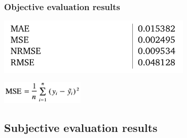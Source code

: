 \documentclass[a4paper,9pt]{beamer}
\theoremstyle{mytheoremstyle}
\begin{document}
\begin{frame}
\frametitle{Objective evaluation results}
\begin{center}
  \includegraphics[width=0.7\textwidth]{res/mse}
\end{center}
\begin{center}
  \includegraphics[width=0.3\textwidth]{res/mse_form}
\end{center}
\end{frame}


\subsection{Subjective evaluation results}
\end{document}
